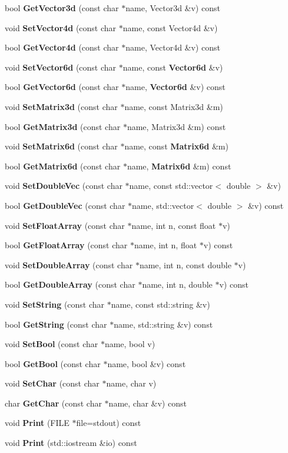 \begin{DoxyCompactItemize}
\item 
bool {\bf \-Get\-Vector3d} (const char $\ast$name, \-Vector3d \&v) const 
\item 
void {\bf \-Set\-Vector4d} (const char $\ast$name, const \-Vector4d \&v)
\item 
bool {\bf \-Get\-Vector4d} (const char $\ast$name, \-Vector4d \&v) const 
\item 
void {\bf \-Set\-Vector6d} (const char $\ast$name, const {\bf \-Vector6d} \&v)
\item 
bool {\bf \-Get\-Vector6d} (const char $\ast$name, {\bf \-Vector6d} \&v) const 
\item 
void {\bf \-Set\-Matrix3d} (const char $\ast$name, const \-Matrix3d \&m)
\item 
bool {\bf \-Get\-Matrix3d} (const char $\ast$name, \-Matrix3d \&m) const 
\item 
void {\bf \-Set\-Matrix6d} (const char $\ast$name, const {\bf \-Matrix6d} \&m)
\item 
bool {\bf \-Get\-Matrix6d} (const char $\ast$name, {\bf \-Matrix6d} \&m) const 
\item 
void {\bf \-Set\-Double\-Vec} (const char $\ast$name, const std\-::vector$<$ double $>$ \&v)
\item 
bool {\bf \-Get\-Double\-Vec} (const char $\ast$name, std\-::vector$<$ double $>$ \&v) const 
\item 
void {\bf \-Set\-Float\-Array} (const char $\ast$name, int n, const float $\ast$v)
\item 
bool {\bf \-Get\-Float\-Array} (const char $\ast$name, int n, float $\ast$v) const 
\item 
void {\bf \-Set\-Double\-Array} (const char $\ast$name, int n, const double $\ast$v)
\item 
bool {\bf \-Get\-Double\-Array} (const char $\ast$name, int n, double $\ast$v) const 
\item 
void {\bf \-Set\-String} (const char $\ast$name, const std\-::string \&v)
\item 
bool {\bf \-Get\-String} (const char $\ast$name, std\-::string \&v) const 
\item 
void {\bf \-Set\-Bool} (const char $\ast$name, bool v)
\item 
bool {\bf \-Get\-Bool} (const char $\ast$name, bool \&v) const 
\item 
void {\bf \-Set\-Char} (const char $\ast$name, char v)
\item 
char {\bf \-Get\-Char} (const char $\ast$name, char \&v) const 
\item 
void {\bf \-Print} (\-F\-I\-L\-E $\ast$file=stdout) const 
\item 
void {\bf \-Print} (std\-::iostream \&io) const 
\end{DoxyCompactItemize}
